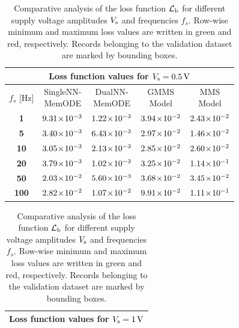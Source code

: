 \documentclass{ieeeaccess}
\begin{document}
\begin{table}
  \caption{Comparative analysis of the loss function \(\mathcal{L}_{\text{b}}\) for different supply voltage amplitudes \(V_{\mathrm s}\) and frequencies \(f_s\). Row-wise minimum and maximum loss values are written in green and red, respectively. Records belonging to the validation dataset are marked by bounding boxes. }
  \label{tab:mms_comp}
  \centering
  \begin{tabular}{c|cccc}
    \toprule
    \multicolumn{5}{c}{\textbf{Loss function values for \(V_{\mathrm s}  = 0.5 \,{\mathrm V}\)}}  \\
    \midrule
    \(f_s\) [Hz] & \makecell{SingleNN-\\MemODE} & \makecell{DualNN-\\ MemODE} & \makecell{GMMS\\Model} & \makecell{MMS\\Model}\\
    \midrule
\textbf{1} & \(9.31 \!\times\! 10^{-3}\) & \color{ieeegreen} \bfseries \(1.22 \!\times\! 10^{-3}\) & \color{ieeered} \bfseries \(3.94 \!\times\! 10^{-2}\) & \(2.43 \!\times\! 10^{-2}\) \\
\cline{1-5}
\multicolumn{1}{|c|}{\textbf{5}} &  \color{ieeegreen} \bfseries \(3.40 \!\times\! 10^{-3}\)  &  \(6.43 \!\times\! 10^{-3}\)  &  \color{ieeered} \bfseries \(2.97 \!\times\! 10^{-2}\)  & \multicolumn{1}{c|}{\(1.46 \!\times\! 10^{-2}\) } \\
\cline{1-5}
\textbf{10} & \(3.05 \!\times\! 10^{-3}\) & \color{ieeegreen} \bfseries \(2.13 \!\times\! 10^{-3}\) & \color{ieeered} \bfseries \(2.85 \!\times\! 10^{-2}\) & \(2.60 \!\times\! 10^{-2}\) \\
\textbf{20} & \(3.79 \!\times\! 10^{-3}\) & \color{ieeegreen} \bfseries \(1.02 \!\times\! 10^{-3}\) & \(3.25 \!\times\! 10^{-2}\) & \color{ieeered} \bfseries \(1.14 \!\times\! 10^{-1}\) \\
\textbf{50} & \(2.03 \!\times\! 10^{-2}\) & \color{ieeegreen} \bfseries \(5.60 \!\times\! 10^{-3}\) & \color{ieeered} \bfseries \(3.68 \!\times\! 10^{-2}\) & \(3.45 \!\times\! 10^{-2}\) \\
\textbf{100} & \(2.82 \!\times\! 10^{-2}\) & \color{ieeegreen} \bfseries \(1.07 \!\times\! 10^{-2}\) & \(9.91 \!\times\! 10^{-2}\) & \color{ieeered} \bfseries \(1.11 \!\times\! 10^{-1}\) \\
    \bottomrule
  \end{tabular}
  \begin{tabular}{c|cccc}
    \toprule
    \multicolumn{5}{c}{\textbf{Loss function values for \(V_{\mathrm s}  = 1 \,{\mathrm V}\)}}    \\
    \midrule

\end{tabular}
\end{table}
\end{document}

